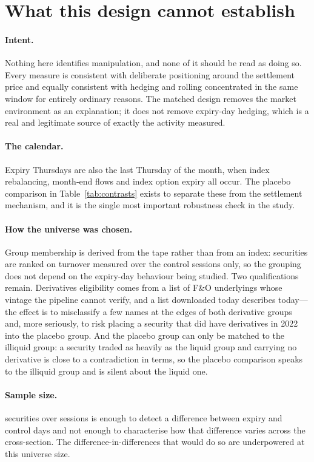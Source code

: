 \section{What this design cannot establish}\label{sec:limitations}

\paragraph{Intent.} Nothing here identifies manipulation, and none of it should be read as
doing so. Every measure is consistent with deliberate positioning around the settlement price
and equally consistent with hedging and rolling concentrated in the same window for entirely
ordinary reasons. The matched design removes the market environment as an explanation; it
does not remove expiry-day hedging, which is a real and legitimate source of exactly the
activity measured.

\paragraph{The calendar.} Expiry Thursdays are also the last Thursday of the month, when
index rebalancing, month-end flows and index option expiry all occur. The placebo comparison
in Table~\ref{tab:contrasts} exists to separate these from the settlement mechanism, and it
is the single most important robustness check in the study.

\paragraph{How the universe was chosen.} Group membership is derived from the tape rather
than from an index: securities are ranked on turnover measured over the control sessions
only, so the grouping does not depend on the expiry-day behaviour being studied. Two
qualifications remain. Derivatives eligibility comes from a list of F\&O underlyings whose
vintage the pipeline cannot verify, and a list downloaded today describes today---the effect
is to misclassify a few names at the edges of both derivative groups and, more seriously, to
risk placing a security that did have derivatives in 2022 into the placebo group. And the
placebo group can only be matched to the illiquid group: a security traded as heavily as the
liquid group and carrying no derivative is close to a contradiction in terms, so the placebo
comparison speaks to the illiquid group and is silent about the liquid one.

\paragraph{Sample size.} \DesignSymbols{} securities over \DesignSessions{} sessions is
enough to detect a difference between expiry and control days and not enough to characterise
how that difference varies across the cross-section. The difference-in-differences that would
do so are underpowered at this universe size.

